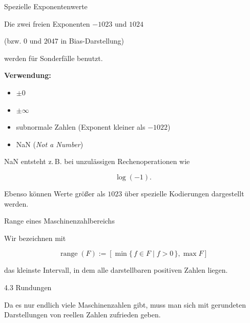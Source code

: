 \documentclass{beamer}
\begin{document}
\begin{frame}{Spezielle Exponentenwerte}

\small

Die zwei freien Exponenten \(-1023\) und \(1024\)

(bzw. \(0\) und \(2047\) in Bias-Darstellung)

werden für Sonderfälle benutzt.

\vspace{0.5cm}

\textbf{Verwendung:}

\begin{itemize}
\item \(\pm 0\)

\item \(\pm \infty\)

\item subnormale Zahlen  
(Exponent kleiner als \(-1022\))

\item NaN (\textit{Not a Number})
\end{itemize}

\vspace{0.5cm}

NaN entsteht z.\,B. bei unzulässigen Rechenoperationen wie

\[
\log(-1).
\]

\vspace{0.4cm}

Ebenso können Werte größer als \(1023\) über spezielle Kodierungen dargestellt werden.

\end{frame}

\begin{frame}{Range eines Maschinenzahlbereichs}

\small

Wir bezeichnen mit

\[
\operatorname{range}(F):=
\left[
\min\{\,f\in F \mid f>0\,\},
\max F
\right]
\]

das kleinste Intervall, in dem alle darstellbaren positiven Zahlen liegen.

\end{frame}


\begin{frame}{4.3 Rundungen}

\small

Da es nur endlich viele Maschinenzahlen gibt,
muss man sich mit gerundeten Darstellungen
von reellen Zahlen zufrieden geben.

\end{frame}
\end{document}

